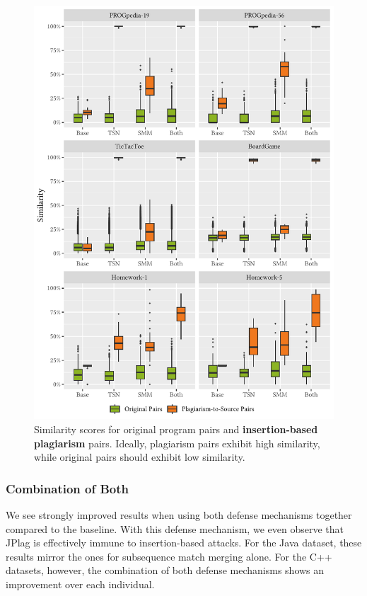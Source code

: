 \begin{figure}
\centering
\includegraphics[width=\linewidth]{figures/disseval/eval-insertion_avg.similarity.pdf}
\caption[Evaluation Results: Insertion-based Obfuscation]{Similarity scores for original program pairs and \textbf{insertion-based plagiarism} pairs. Ideally, plagiarism pairs exhibit high similarity, while original pairs should exhibit low similarity.}
\label{fig:stage1-results}
\end{figure}

\subsubsection{Combination of Both}
We see strongly improved results when using both defense mechanisms together compared to the baseline.
With this defense mechanism, we even observe that JPlag is effectively immune to insertion-based attacks.
For the Java dataset, these results mirror the ones for subsequence match merging alone.
For the C++ datasets, however, the combination of both defense mechanisms shows an improvement over each individual.

